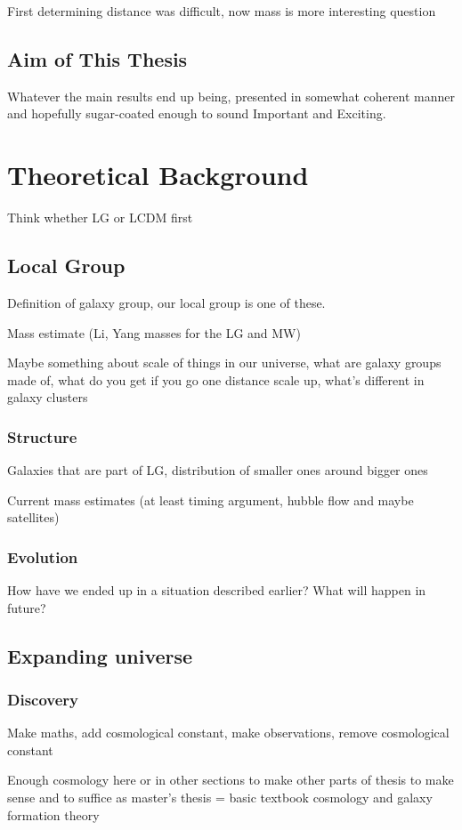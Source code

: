 \documentclass[english, oneside]{HYgradu}
\begin{document}
First determining distance was difficult, now mass is more interesting question

\section{Aim of This Thesis}
Whatever the main results end up being, presented in somewhat coherent manner and hopefully sugar-coated enough to sound Important and Exciting.


\chapter{Theoretical Background}
Think whether LG or LCDM first
\section{Local Group}
Definition of galaxy group, our local group is one of these.

Mass estimate (Li, Yang masses for the LG and MW)

Maybe something about scale of things in our universe, what are galaxy groups made of, what do you get if you go one distance scale up, what's different in galaxy clusters

\subsection{Structure}
Galaxies that are part of LG, distribution of smaller ones around bigger ones

Current mass estimates (at least timing argument, hubble flow and maybe satellites)

\subsection{Evolution}
How have we ended up in a situation described earlier? What will happen in future?


\section{Expanding universe}
\subsection{Discovery}
Make maths, add cosmological constant, make observations, remove cosmological constant

Enough cosmology here or in other sections to make other parts of thesis to make sense and to suffice as master's thesis = basic textbook cosmology and galaxy formation theory %
\end{document}
